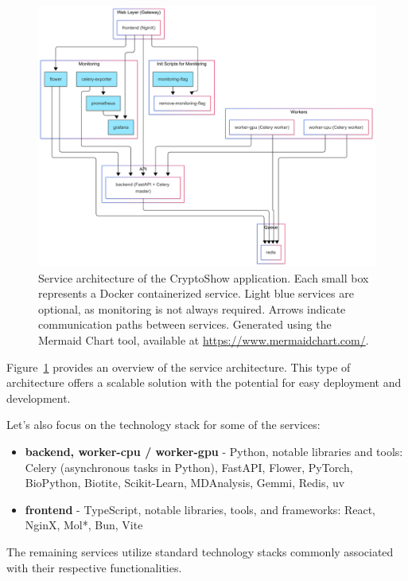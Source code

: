 \begin{figure}[htpb]
    \centering
    \includegraphics[width=\textwidth]{img/architecture.png}
    \caption{Service architecture of the CryptoShow application. Each small box represents a Docker containerized service. Light blue services are optional, as monitoring is not always required. Arrows indicate communication paths between services. Generated using the Mermaid Chart tool, available at \url{https://www.mermaidchart.com/}.}
    \label{fig:architecture}
\end{figure}

Figure~\ref{fig:architecture} provides an overview of the service architecture. This type of architecture offers a scalable solution with the potential for easy deployment and development.

Let's also focus on the technology stack for some of the services:

\begin{itemize}
    \item \textbf{backend, worker-cpu / worker-gpu} - Python, notable libraries and tools: Celery (asynchronous tasks in Python), FastAPI, Flower, PyTorch, BioPython, Biotite, Scikit-Learn, MDAnalysis, Gemmi, Redis, uv
    \item \textbf{frontend} - TypeScript, notable libraries, tools, and frameworks: React, NginX, Mol*, Bun, Vite
\end{itemize}

The remaining services utilize standard technology stacks commonly associated with their respective functionalities.

